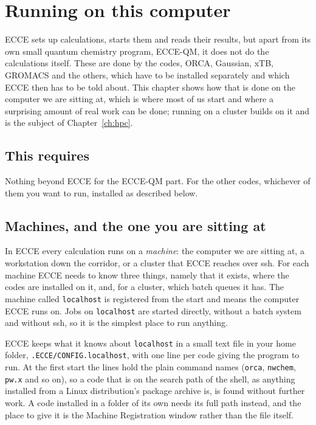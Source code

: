 \chapter{Running on this computer}
\label{ch:machines}

ECCE sets up calculations, starts them and reads their results, but apart from its own small quantum chemistry program, ECCE-QM, it does not do the calculations itself. These are done by the codes, ORCA, Gaussian, xTB, GROMACS and the others, which have to be installed separately and which ECCE then has to be told about. This chapter shows how that is done on the computer we are sitting at, which is where most of us start and where a surprising amount of real work can be done; running on a cluster builds on it and is the subject of Chapter~\ref{ch:hpc}.

\section*{This requires}
Nothing beyond ECCE for the ECCE-QM part. For the other codes, whichever of them you want to run, installed as described below.

\section{Machines, and the one you are sitting at}
In ECCE every calculation runs on a \emph{machine}: the computer we are sitting at, a workstation down the corridor, or a cluster that ECCE reaches over ssh. For each machine ECCE needs to know three things, namely that it exists, where the codes are installed on it, and, for a cluster, which batch queues it has. The machine called \texttt{localhost} is registered from the start and means the computer ECCE runs on. Jobs on \texttt{localhost} are started directly, without a batch system and without ssh, so it is the simplest place to run anything.

ECCE keeps what it knows about \texttt{localhost} in a small text file in your home folder, \texttt{.ECCE/CONFIG.localhost}, with one line per code giving the program to run. At the first start the lines hold the plain command names (\texttt{orca}, \texttt{nwchem}, \texttt{pw.x} and so on), so a code that is on the search path of the shell, as anything installed from a Linux distribution's package archive is, is found without further work. A code installed in a folder of its own needs its full path instead, and the place to give it is the Machine Registration window rather than the file itself.

